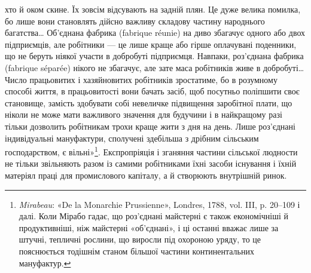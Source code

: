 хто й оком скине. Їх зовсім відсувають на задній плян. Це дуже
велика помилка, бо лише вони становлять дійсно важливу складову
частину народнього багатства\dots{} Об’єднана фабрика (fabrique
réunie) на диво збагачує одного або двох підприємців, але
робітники — це лише краще або гірше оплачувані поденники,
що не беруть ніякої участи в добробуті підприємця. Навпаки,
роз’єднана фабрика (fabrique séparée) нікого не збагачує, але
зате маса робітників живе в добробуті\dots{} Число працьовитих і
хазяйновитих робітників зростатиме, бо в розумному способі
життя, в працьовитості вони бачать засіб, щоб посутньо поліпшити
своє становище, замість здобувати собі невеличке підвищення
заробітної плати, що ніколи не може мати важливого
значення для будучини і в найкращому разі тільки дозволить
робітникам трохи краще жити з дня на день. Лише роз’єднані
індивідуальні мануфактури, сполучені здебільша з дрібним сільським
господарством, є вільні»\footnote{
\emph{Mirabeau}: «De la Monarchie Prussienne», Londres, 1788, vol. III,
p. 20--109 і далі. Коли Мірабо гадає, що роз’єднані майстерні є
також економічніші й продуктивніші, ніж майстерні «об’єднані», і ці
останні вважає лише за штучні, тепличні рослини, що виросли під охороною
уряду, то це пояснюється тодішнім станом більшої частини континентальних
мануфактур.
}. Експропріяція і зганяння
частини сільської людности не тільки звільняють разом із самими
робітниками їхні засоби існування і їхній матеріял праці для
промислового капіталу, а й створюють внутрішній ринок.

